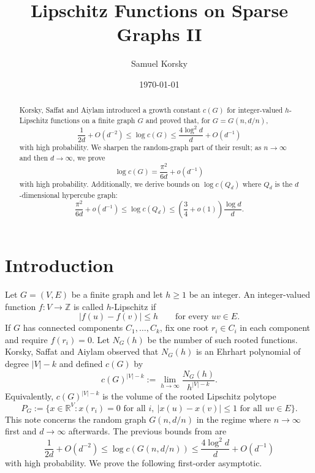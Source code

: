 \documentclass[11pt]{article}
\title{Lipschitz Functions on Sparse Graphs II}
\author{Samuel Korsky}
\date{\today}
\theoremstyle{definition}
\newcommand{\RR}{\mathbb{R}}
\newcommand{\ZZ}{\mathbb{Z}}
\begin{document}
\maketitle

\begin{abstract}
\noindent
Korsky, Saffat and Aiylam introduced a growth constant $c(G)$ for integer-valued $h$-Lipschitz functions on a finite graph $G$ and proved that, for $G=G(n,d/n)$,
\[
  \frac{1}{2d}+O(d^{-2})\le \log c(G)\le
  \frac{4\log^2 d}{d}+O(d^{-1})
\]
with high probability.  We sharpen the random-graph part of their result; as $n\to\infty$ and then $d\to\infty$, we prove
\[
  \log c(G)=\frac{\pi^2}{6d}+o(d^{-1})
\]
with high probability.  Additionally, we derive bounds on $\log c(Q_d)$ where $Q_d$ is the $d$-dimensional hypercube graph:
\[
  \frac{\pi^2}{6d}+o(d^{-1}) \le \log{c(Q_d)}\le
  \left(\frac{3}{4} + o(1)\right)\frac{\log d}{d}.
\]
\end{abstract}

\section{Introduction}

Let $G=(V,E)$ be a finite graph and let $h\ge1$ be an integer.  An integer-valued function $f:V\to\ZZ$ is called $h$-Lipschitz if
\[
  |f(u)-f(v)|\le h\qquad\text{for every }uv\in E.
\]
If $G$ has connected components $C_1,\ldots,C_k$, fix one root $r_i\in C_i$ in each component and require $f(r_i)=0$.  Let $N_G(h)$ be the number of such rooted functions.  Korsky, Saffat and Aiylam observed that $N_G(h)$ is an Ehrhart polynomial of degree $|V|-k$ and defined $c(G)$ by
\begin{equation}\label{eq:def-c}
  c(G)^{|V|-k}:=\lim_{h\to\infty}\frac{N_G(h)}{h^{|V|-k}}.
\end{equation}
Equivalently, $c(G)^{|V|-k}$ is the volume of the rooted Lipschitz polytope
\begin{equation}\label{eq:polytope}
  P_G:=\{x\in\RR^V:x(r_i)=0\text{ for all }i,
  \ |x(u)-x(v)|\le1\text{ for all }uv\in E\}.
\end{equation}
This note concerns the random graph $G(n,d/n)$ in the regime where $n\to\infty$ first and $d\to\infty$ afterwards.  The previous bounds from \cite{KorskySaffatAiylam} are
\begin{equation}\label{eq:old-bounds}
  \frac{1}{2d}+O(d^{-2})\le \log c(G(n,d/n))\le
  \frac{4\log^2 d}{d}+O(d^{-1})
\end{equation}
with high probability.  We prove the following first-order asymptotic.
\end{document}
